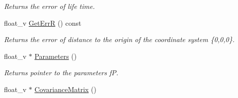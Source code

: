 \begin{DoxyCompactItemize}
\begin{DoxyCompactList}\small\item\em Returns the error of life time. \end{DoxyCompactList}\item 
float\+\_\+v \hyperlink{classKFParticleSIMD_af72ee39cb2f92477b14a8c748746692d}{Get\+ErrR} () const \hypertarget{classKFParticleSIMD_af72ee39cb2f92477b14a8c748746692d}{}\label{classKFParticleSIMD_af72ee39cb2f92477b14a8c748746692d}

\begin{DoxyCompactList}\small\item\em Returns the error of distance to the origin of the coordinate system \{0,0,0\}. \end{DoxyCompactList}\item 
float\+\_\+v $\ast$ \hyperlink{classKFParticleSIMD_a27d7e843526677a4a1a0b755f7fb5d65}{Parameters} ()\hypertarget{classKFParticleSIMD_a27d7e843526677a4a1a0b755f7fb5d65}{}\label{classKFParticleSIMD_a27d7e843526677a4a1a0b755f7fb5d65}

\begin{DoxyCompactList}\small\item\em Returns pointer to the parameters fP. \end{DoxyCompactList}\item 
float\+\_\+v $\ast$ \hyperlink{classKFParticleSIMD_aaa2f81f07799d2d9beaede2e7864a1a9}{Covariance\+Matrix} ()\hypertarget{classKFParticleSIMD_aaa2f81f07799d2d9beaede2e7864a1a9}{}\label{classKFParticleSIMD_aaa2f81f07799d2d9beaede2e7864a1a9}


\end{DoxyCompactItemize}
